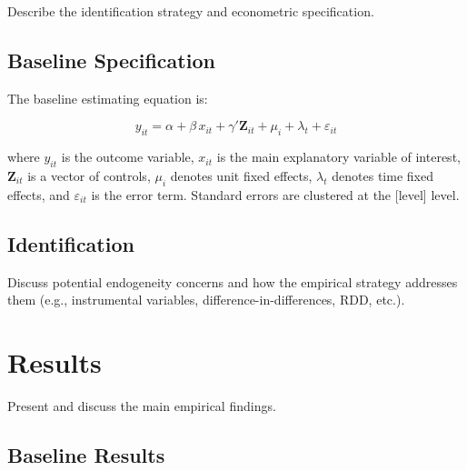 \documentclass[12pt, a4paper]{article}
\theoremstyle{definition}
\theoremstyle{remark}
\begin{document}
Describe the identification strategy and econometric specification.

\subsection{Baseline Specification}

The baseline estimating equation is:

\begin{equation}
    y_{it} = \alpha + \beta \, x_{it} + \gamma' \mathbf{Z}_{it} + \mu_{i} + \lambda_{t} + \varepsilon_{it}
    \label{eq:baseline}
\end{equation}

\noindent where $y_{it}$ is the outcome variable, $x_{it}$ is the main explanatory
variable of interest, $\mathbf{Z}_{it}$ is a vector of controls, $\mu_{i}$ denotes
unit fixed effects, $\lambda_{t}$ denotes time fixed effects, and $\varepsilon_{it}$
is the error term. Standard errors are clustered at the [level] level.

\subsection{Identification}

Discuss potential endogeneity concerns and how the empirical strategy addresses them
(e.g., instrumental variables, difference-in-differences, RDD, etc.).

\section{Results}
\label{sec:results}

Present and discuss the main empirical findings.

\subsection{Baseline Results}
\end{document}
